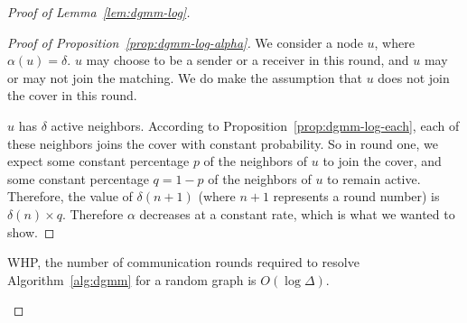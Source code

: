 \begin{proof}[Proof of Lemma~\ref{lem:dgmm-log}]
\begin{proof}[Proof of Proposition~\ref{prop:dgmm-log-alpha}]

We consider a node $u$, where $\alpha(u) = \delta$. $u$ may choose to be a sender or a receiver in this round, and $u$ may or may not join the matching. We do make the assumption that $u$ does not join the cover in this round.

$u$ has $\delta$ active neighbors. According to Proposition~\ref{prop:dgmm-log-each}, each of these neighbors joins the cover with constant probability. So in round one, we expect some constant percentage $p$ of the neighbors of $u$ to join the cover, and some constant percentage $q = 1-p$ of the neighbors of $u$ to remain active. Therefore, the value of $\delta(n+1)$ (where $n+1$ represents a round number) is $\delta(n) \times q$. Therefore $\alpha$ decreases at a constant rate, which is what we wanted to show.

\end{proof}

\begin{cor}WHP, the number of communication rounds required to resolve Algorithm~\ref{alg:dgmm} for a random graph is $O(\log\Delta)$.\end{cor}

\end{proof} 
